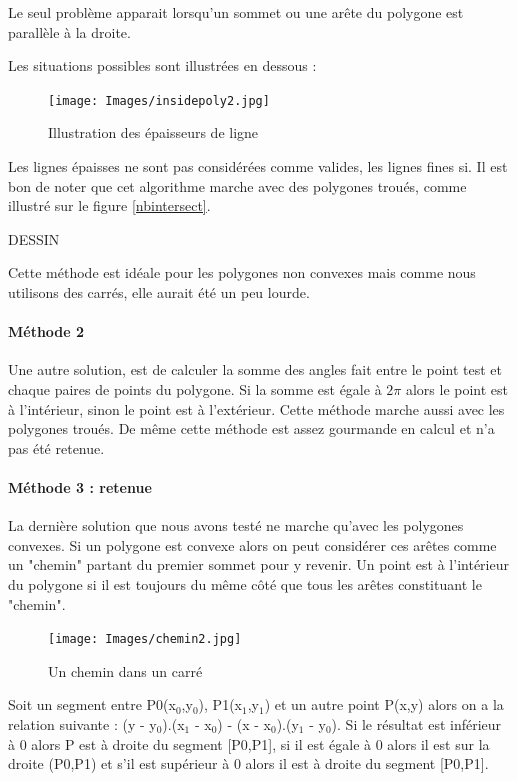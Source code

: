 \documentclass[a4paper,12pt]{report}
\begin{document}
Le seul problème apparait lorsqu'un sommet ou une arête du polygone est parallèle à la droite.

Les situations possibles sont illustrées en dessous :

\begin{figure}[h]
\centering
\texttt{[image: Images/insidepoly2.jpg]}
\caption{Illustration des épaisseurs de ligne}
\end{figure}
\vspace{0.5cm}

Les lignes épaisses ne sont pas considérées comme valides, les lignes fines si.
Il est bon de noter que cet algorithme marche avec des polygones troués, comme illustré sur le figure \ref{nbintersect}.

DESSIN

Cette méthode est idéale pour les polygones non convexes mais comme nous utilisons des carrés, elle aurait été un peu lourde.

\paragraph{Méthode 2 }
Une autre solution, est de calculer la somme des angles fait entre le point test et chaque paires de points du polygone. Si la somme est égale à $2\pi$ alors le point est à l'intérieur, sinon le point est à l'extérieur. 
Cette méthode marche aussi avec les polygones troués.
De même cette méthode est assez gourmande en calcul et n'a pas été retenue.

\paragraph{Méthode 3 : retenue}
La dernière solution que nous avons testé ne marche qu'avec les polygones convexes. Si un polygone est convexe alors on peut considérer ces arêtes comme un "chemin" partant du premier sommet pour y revenir. 
Un point est à l'intérieur du polygone si il est toujours du même côté que tous les arêtes constituant le "chemin".

\begin{figure}[h]
\centering
\texttt{[image: Images/chemin2.jpg]}
\caption{Un chemin dans un carré}
\end{figure}
\vspace{0.5cm}

Soit un segment entre P0(x$_{0}$,y$_{0}$), P1(x$_{1}$,y$_{1}$) et un autre point P(x,y) alors on a la relation suivante : (y - y$_{0}$).(x$_{1}$ - x$_{0}$) - (x - x$_{0}$).(y$_{1}$ - y$_{0}$).
Si le résultat est inférieur à 0 alors P est à droite du segment [P0,P1], si il est égale à 0 alors il est sur la droite (P0,P1) et s'il est supérieur à 0 alors il est à droite du segment [P0,P1].
\end{document}
